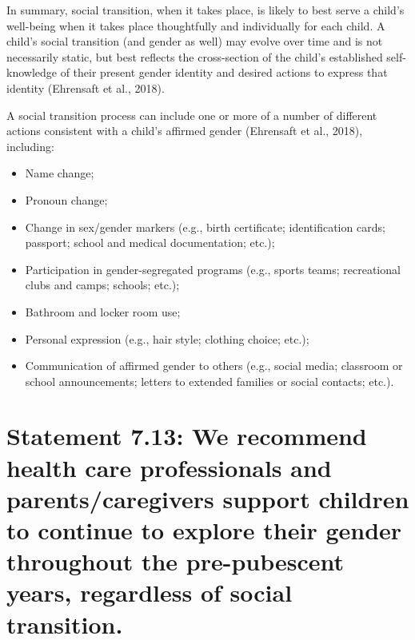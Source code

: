 \documentclass[
]{book}
\providecommand{\tightlist}{%
  \setlength{\itemsep}{0pt}\setlength{\parskip}{0pt}}
\begin{document}
In summary, social transition, when it takes
place, is likely to best serve a child's well-being
when it takes place thoughtfully and individually
for each child. A child's social transition (and
gender as well) may evolve over time and is not
necessarily static, but best reflects the cross-section
of the child's established self-knowledge of their
present gender identity and desired actions to
express that identity (Ehrensaft et al., 2018).

A social transition process can include one or
more of a number of different actions consistent
with a child's affirmed gender (Ehrensaft et al.,
2018), including:

\begin{itemize}
\tightlist
\item
  Name change;
\item
  Pronoun change;
\item
  Change in sex/gender markers (e.g., birth certificate; identification cards; passport; school and medical documentation; etc.);
\item
  Participation in gender-segregated programs (e.g., sports teams; recreational clubs and camps; schools; etc.);
\item
  Bathroom and locker room use;
\item
  Personal expression (e.g., hair style; clothing choice; etc.);
\item
  Communication of affirmed gender to others (e.g., social media; classroom or school announcements; letters to extended families or social contacts; etc.).
\end{itemize}

\hypertarget{statement-7.13-we-recommend-health-care-professionals-and-parentscaregivers-support-children-to-continue-to-explore-their-gender-throughout-the-pre-pubescent-years-regardless-of-social-transition.}{%
\section*{Statement 7.13: We recommend health care professionals and parents/caregivers support children to continue to explore their gender throughout the pre-pubescent years, regardless of social transition.}\label{statement-7.13-we-recommend-health-care-professionals-and-parentscaregivers-support-children-to-continue-to-explore-their-gender-throughout-the-pre-pubescent-years-regardless-of-social-transition.}}
\end{document}
